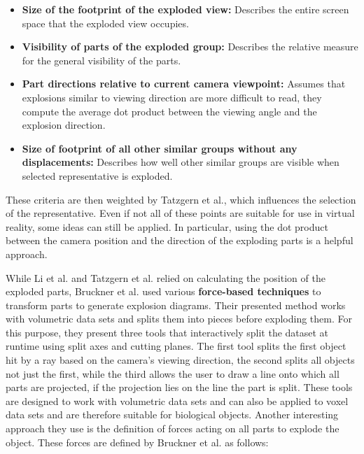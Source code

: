 \begin{itemize}
	\item \textbf{Size of the footprint of the exploded view:} Describes the entire screen space that the exploded view occupies.
	\item \textbf{Visibility of parts of the exploded group:} Describes the relative measure for the general visibility of the parts.
	\item \textbf{Part directions relative to current camera viewpoint:} Assumes that explosions similar to viewing direction are more difficult to read, they compute the average dot product between the viewing angle and the explosion direction.
	\item \textbf{Size of footprint of all other similar groups without any displacements:} Describes how well other similar groups are visible when selected representative is exploded.
\end{itemize}

These criteria are then weighted by Tatzgern et al., which influences the selection of the representative.
Even if not all of these points are suitable for use in virtual reality, some ideas can still be applied. In particular, using the dot product between the camera position and the direction of the exploding parts is a helpful approach.

While Li et al. and Tatzgern et al. relied on calculating the position of the exploded parts, Bruckner et al. used various \textbf{force-based techniques} to transform parts to generate explosion diagrams.\cite{Bruckner_2006}
Their presented method works with volumetric data sets and splits them into pieces before exploding them. 
For this purpose, they present three tools that interactively split the dataset at runtime using split axes and cutting planes. 
The first tool splits the first object hit by a ray based on the camera's viewing direction, the second splits all objects not just the first, while the third allows the user to draw a line onto which all parts are projected, if the projection lies on the line the part is split. 
These tools are designed to work with volumetric data sets and can also be applied to voxel data sets and are therefore suitable for biological objects.
Another interesting approach they use is the definition of forces acting on all parts to explode the object.
These forces are defined by Bruckner et al. as follows:

